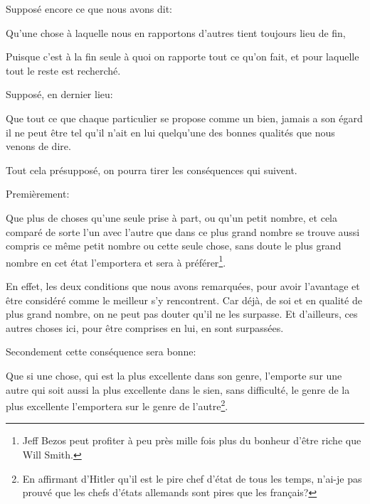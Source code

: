 Supposé encore ce que nous avons dit: 

\begin{emphpar}
	Qu'une chose à laquelle nous en rapportons d'autres tient toujours lieu de fin,
\end{emphpar}

Puisque c'est à la fin seule à quoi on rapporte tout ce qu'on fait, et pour laquelle tout le reste est recherché.

Supposé, en dernier lieu:

\begin{emphpar}
	Que tout ce que chaque particulier se propose comme un bien, jamais a son égard il ne peut être tel qu'il n'ait
	en lui quelqu'une des bonnes qualités que nous venons de dire.
\end{emphpar}

Tout cela présupposé, on pourra tirer les conséquences qui suivent.

\bigbreak 

Premièrement:

\begin{lieu}
	Que plus de choses qu'une seule prise à part, ou qu'un petit nombre, et cela comparé de sorte l'un avec l'autre
	que dans ce plus grand nombre se trouve aussi compris ce même petit nombre ou cette seule chose, sans doute le plus
	grand nombre en cet état l'emportera et sera à préférer\footnote{Jeff Bezos peut profiter à peu près mille fois
	plus du bonheur d’être riche que Will Smith.}.
\end{lieu}

En effet, les deux conditions que nous avons remarquées, pour avoir l'avantage et être considéré comme le meilleur s'y
rencontrent. Car déjà, de soi et en qualité de plus grand nombre, on ne peut pas douter qu'il ne les surpasse. Et
d'ailleurs, ces autres choses ici, pour être comprises en lui, en sont surpassées.

\bigbreak 

Secondement cette conséquence sera bonne:

\begin{lieu}
	Que si une chose, qui est la plus excellente dans son genre, l'emporte sur une autre qui soit aussi la plus excellente
	dans le sien, sans difficulté, le genre de la plus excellente l'emportera sur le genre de l'autre\footnote{En affirmant
	d'Hitler qu'il est le pire chef d'état de tous les temps, n'ai-je pas prouvé que les chefs d'états allemands sont pires
	que les français?}.
\end{lieu}

